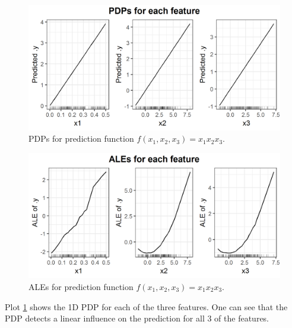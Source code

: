 \documentclass[]{krantz}
\begin{document}
\begin{figure}
\includegraphics[width=1\linewidth]{images/ale_1_PDPs_x1x2x3_150_0_0p5_2_2} \caption{PDPs for prediction function
\(f(x_1, x_2, x_3) = x_1 x_2 x_3\).}\label{fig:pdpsx1x2x3}
\end{figure}




\begin{figure}
\includegraphics[width=1\linewidth]{images/ale_1_ALEs_x1x2x3_150_0_0p5_2_2} \caption{ALEs for prediction function
\(f(x_1, x_2, x_3) = x_1 x_2 x_3\).}\label{fig:alesx1x2x3}
\end{figure}




Plot \ref{fig:pdpsx1x2x3} shows the 1D PDP for each of the three
features. One can see that the PDP detects a linear influence on the
prediction for all 3 of the features.
\end{document}
